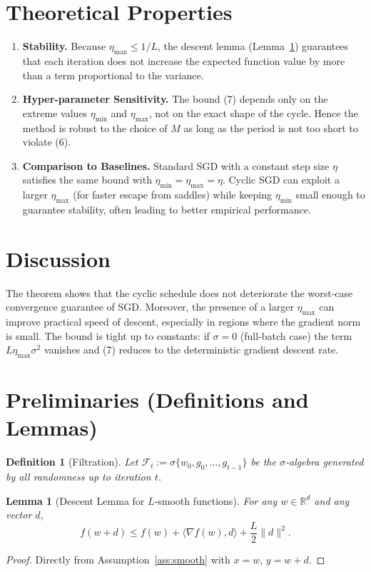 \documentclass{article}
\newtheorem{lemma}{Lemma}
\newtheorem{definition}{Definition}
\begin{document}
\section*{Theoretical Properties}
\begin{enumerate}[label=\arabic*.]
    \item \textbf{Stability.} Because $\eta_{\max}\le 1/L$, the descent lemma (Lemma~\ref{lem:descent}) guarantees that each iteration does not increase the expected function value by more than a term proportional to the variance.
    \item \textbf{Hyper‑parameter Sensitivity.} The bound (7) depends only on the extreme values $\eta_{\min}$ and $\eta_{\max}$, not on the exact shape of the cycle. Hence the method is robust to the choice of $M$ as long as the period is not too short to violate (6).
    \item \textbf{Comparison to Baselines.} Standard SGD with a constant step size $\eta$ satisfies the same bound with $\eta_{\min}=\eta_{\max}=\eta$. Cyclic SGD can exploit a larger $\eta_{\max}$ (for faster escape from saddles) while keeping $\eta_{\min}$ small enough to guarantee stability, often leading to better empirical performance.
\end{enumerate}

\section*{Discussion}
The theorem shows that the cyclic schedule does not deteriorate the worst‑case convergence guarantee of SGD. Moreover, the presence of a larger $\eta_{\max}$ can improve practical speed of descent, especially in regions where the gradient norm is small. The bound is tight up to constants: if $\sigma=0$ (full‑batch case) the term $L\eta_{\max}\sigma^2$ vanishes and (7) reduces to the deterministic gradient descent rate.

\newpage

\section*{Preliminaries (Definitions and Lemmas)}
\begin{definition}[Filtration]
Let $\mathcal{F}_t:=\sigma\{w_0,g_0,\dots,g_{t-1}\}$ be the $\sigma$‑algebra generated by all randomness up to iteration $t$.
\end{definition}

\begin{lemma}[Descent Lemma for $L$‑smooth functions]\label{lem:descent}
For any $w\in\mathbb{R}^d$ and any vector $d$,
\[
f(w+d)\le f(w)+\langle\nabla f(w),d\rangle+\frac{L}{2}\|d\|^2 .
\tag{8}
\]
\end{lemma}
\begin{proof}
Directly from Assumption~\ref{ass:smooth} with $x=w$, $y=w+d$.
\end{proof}
\end{document}
